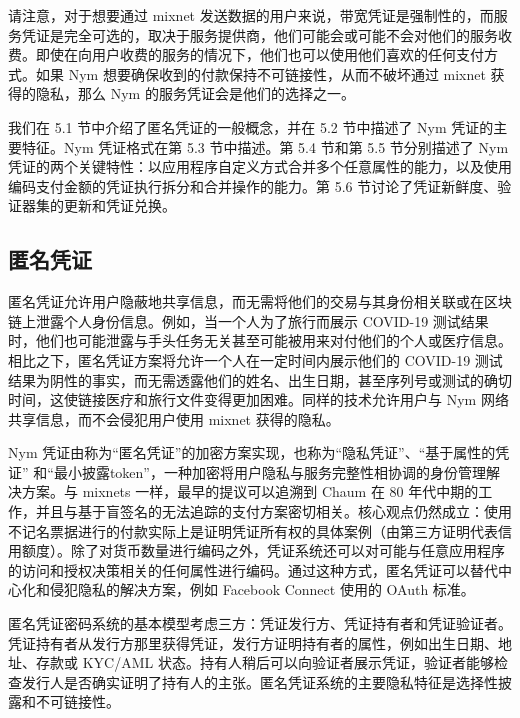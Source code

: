 \documentclass{article}
\begin{document}
	请注意，对于想要通过 mixnet 发送数据的用户来说，带宽凭证是强制性的，而服务凭证是完全可选的，取决于服务提供商，他们可能会或可能不会对他们的服务收费。即使在向用户收费的服务的情况下，他们也可以使用他们喜欢的任何支付方式。如果 Nym 想要确保收到的付款保持不可链接性，从而不破坏通过 mixnet 获得的隐私，那么 Nym 的服务凭证会是他们的选择之一。\newline

	我们在 5.1 节中介绍了匿名凭证的一般概念，并在 5.2 节中描述了 Nym 凭证的主要特征。Nym 凭证格式在第 5.3 节中描述。第 5.4 节和第 5.5 节分别描述了 Nym 凭证的两个关键特性：以应用程序自定义方式合并多个任意属性的能力，以及使用编码支付金额的凭证执行拆分和合并操作的能力。第 5.6 节讨论了凭证新鲜度、验证器集的更新和凭证兑换。\newline

	\subsection{匿名凭证}

	匿名凭证允许用户隐蔽地共享信息，而无需将他们的交易与其身份相关联或在区块链上泄露个人身份信息。例如，当一个人为了旅行而展示 COVID-19 测试结果时，他们也可能泄露与手头任务无关甚至可能被用来对付他们的个人或医疗信息。相比之下，匿名凭证方案将允许一个人在一定时间内展示他们的 COVID-19 测试结果为阴性的事实，而无需透露他们的姓名、出生日期，甚至序列号或测试的确切时间，这使链接医疗和旅行文件变得更加困难。同样的技术允许用户与 Nym 网络共享信息，而不会侵犯用户使用 mixnet 获得的隐私。\newline

	Nym 凭证由称为“匿名凭证”\cite{ref14}的加密方案实现，也称为“隐私凭证”\cite{ref13}、“基于属性的凭证”\cite{ref12} 和“最小披露token”\cite{ref9}，一种加密将用户隐私与服务完整性相协调的身份管理解决方案。与 mixnets 一样，最早的提议可以追溯到 Chaum 在 80 年代中期的工作\cite{ref18}，并且与基于盲签名的无法追踪的支付方案密切相关\cite{ref17}。核心观点仍然成立：使用不记名票据进行的付款实际上是证明凭证所有权的具体案例（由第三方证明代表信用额度）。除了对货币数量进行编码之外，凭证系统还可以对可能与任意应用程序的访问和授权决策相关的任何属性进行编码。通过这种方式，匿名凭证可以替代中心化和侵犯隐私的解决方案，例如 Facebook Connect \cite{ref52} 使用的 OAuth 标准。\newline

	匿名凭证密码系统的基本模型考虑三方：凭证发行方、凭证持有者和凭证验证者。凭证持有者从发行方那里获得凭证，发行方证明持有者的属性，例如出生日期、地址、存款或 KYC/AML 状态。持有人稍后可以向验证者展示凭证，验证者能够检查发行人是否确实证明了持有人的主张。匿名凭证系统的主要隐私特征是选择性披露和不可链接性。\newline
\end{document}

